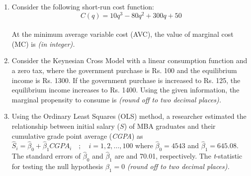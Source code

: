 \documentclass[12pt]{article}
\theoremstyle{remark}
\begin{document}
\begin{enumerate}
\hfill{}
\item  Consider the following short-run cost function: 
\hspace{1cm} $$C(q) = 10q^3 - 80q^2 + 300q + 50$$ \\
At the minimum average variable cost (AVC), the value of marginal cost (MC) is \underline{\hspace{2cm}} \textit{(in integer).} 
\newline

\hfill{}
\item  Consider the Keynesian Cross Model with a linear consumption function and a zero tax, where the government purchase is Rs. 100 and the equilibrium income is Rs. 1300. If the government purchase is increased to Rs. 125, the equilibrium income increases to Rs. 1400. Using the given information, the marginal propensity to consume is \underline{\hspace{2cm}} \textit{(round off to two decimal places).} 
\newline

\hfill{}
\item Using the Ordinary Least Squares (OLS) method, a researcher estimated the relationship between initial salary ($S$) of MBA graduates and their cumulative grade point average (\textit{CGPA}) as \newline
\hspace{1cm} $\hat{S}_i = \hat{\beta}_0 + \hat{\beta}_1 CGPA_i \quad ; \quad i = 1, 2, \ldots, 100$ \newline
where $\hat{\beta}_0 = 4543$ and $\hat{\beta}_1 = 645.08$. The standard errors of $\hat{\beta}_0$ and $\hat{\beta}_1$ are  and 70.01, respectively. \newline
The \textit{t}-statistic for testing the null hypothesis $\beta_1 = 0$ \underline{\hspace{2cm}} \textit{(round off to two decimal places).} 
\newline


\end{enumerate}
\end{document}
